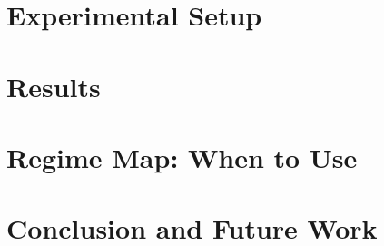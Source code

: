 \section{Experimental Setup}
\label{sec:setup}


\section{Results}
\label{sec:results}


\section{Regime Map: When to Use \QSVM{}}
\label{sec:regimemap}



\section{Conclusion and Future Work}
\label{sec:conclusion}




